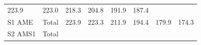 \documentclass[]{article}
\begin{document}
\begin{longtable}[]{@{}llrrrrrr@{}}
\begin{minipage}[t]{0.09\columnwidth}
223.9\strut
\end{minipage} & \begin{minipage}[t]{0.09\columnwidth}\raggedleft\strut
223.0\strut
\end{minipage} & \begin{minipage}[t]{0.09\columnwidth}\raggedleft\strut
218.3\strut
\end{minipage} & \begin{minipage}[t]{0.09\columnwidth}\raggedleft\strut
204.8\strut
\end{minipage} & \begin{minipage}[t]{0.09\columnwidth}\raggedleft\strut
191.9\strut
\end{minipage} & \begin{minipage}[t]{0.09\columnwidth}\raggedleft\strut
187.4\strut
\end{minipage}\tabularnewline
\begin{minipage}[t]{0.14\columnwidth}\raggedright\strut
S1 AME\strut
\end{minipage} & \begin{minipage}[t]{0.13\columnwidth}\raggedright\strut
Total\strut
\end{minipage} & \begin{minipage}[t]{0.09\columnwidth}\raggedleft\strut
223.9\strut
\end{minipage} & \begin{minipage}[t]{0.09\columnwidth}\raggedleft\strut
223.3\strut
\end{minipage} & \begin{minipage}[t]{0.09\columnwidth}\raggedleft\strut
211.9\strut
\end{minipage} & \begin{minipage}[t]{0.09\columnwidth}\raggedleft\strut
194.4\strut
\end{minipage} & \begin{minipage}[t]{0.09\columnwidth}\raggedleft\strut
179.9\strut
\end{minipage} & \begin{minipage}[t]{0.09\columnwidth}\raggedleft\strut
174.3\strut
\end{minipage}\tabularnewline
\begin{minipage}[t]{0.14\columnwidth}\raggedright\strut
S2 AMS1\strut
\end{minipage} & \begin{minipage}[t]{0.13\columnwidth}\raggedright\strut
Total\strut
\end{minipage} & \begin{minipage}[t]{0.09\columnwidth}\raggedleft\strut

\end{minipage}
\end{longtable}
\end{document}
